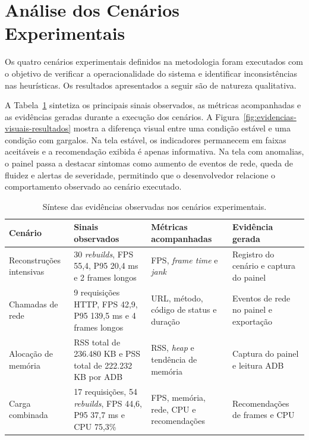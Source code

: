 \section{Análise dos Cenários Experimentais}

Os quatro cenários experimentais definidos na metodologia foram executados com o objetivo de verificar a operacionalidade do sistema e identificar inconsistências nas heurísticas. Os resultados apresentados a seguir são de natureza qualitativa.

A Tabela~\ref{tab:resultados-cenarios} sintetiza os principais sinais observados, as métricas acompanhadas e as evidências geradas durante a execução dos cenários. A Figura~\ref{fig:evidencias-visuais-resultados} mostra a diferença visual entre uma condição estável e uma condição com gargalos.
Na tela estável, os indicadores permanecem em faixas aceitáveis e a recomendação exibida é apenas informativa. Na tela com anomalias, o painel passa a destacar sintomas como aumento de eventos de rede, queda de fluidez e alertas de severidade, permitindo que o desenvolvedor relacione o comportamento observado ao cenário executado.

\begin{table}[H]
\centering
\caption{Síntese das evidências observadas nos cenários experimentais.}
\label{tab:resultados-cenarios}
\small
\renewcommand{\arraystretch}{1.3}
\footnotesize
\begin{tabular}{|p{2.8cm}|p{4cm}|p{3.8cm}|p{2.8cm}|}
\hline
\textbf{Cenário} & \textbf{Sinais observados} & \textbf{Métricas acompanhadas} & \textbf{Evidência gerada} \\
\hline
Reconstruções intensivas & 30 \textit{rebuilds}, FPS 55{,}4, P95 20{,}4 ms e 2 frames longos & FPS, \textit{frame time} e \textit{jank} & Registro do cenário e captura do painel \\
\hline
Chamadas de rede & 9 requisições HTTP, FPS 42{,}9, P95 139{,}5 ms e 4 frames longos & URL, método, código de status e duração & Eventos de rede no painel e exportação \\
\hline
Alocação de memória & RSS total de 236.480 KB e PSS total de 222.232 KB por ADB & RSS, \textit{heap} e tendência de memória & Captura do painel e leitura ADB \\
\hline
Carga combinada & 17 requisições, 54 \textit{rebuilds}, FPS 44{,}6, P95 37{,}7 ms e CPU 75{,}3\% & FPS, memória, rede, CPU e recomendações & Recomendações de frames e CPU \\
\hline
\end{tabular}
\end{table}

